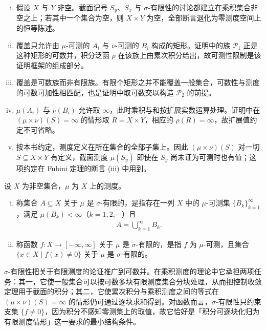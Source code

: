 \documentclass[../../main.tex]{subfiles}%
\begin{document}
\begin{remark}\label{remark:ch01-def-1-16-条件}
\begin{enumerate}[(i)]
\item 假设 $X$ 与 $Y$ 非空。截面记号 $S_y$、$S_x$ 与 $\sigma$-有限性的讨论都建立在乘积集合非空之上；若其中一个集合为空，则 $X\times Y$ 为空，全部断言退化为零测度空间上的恒等陈述。
\item 覆盖只允许由 $\mu$-可测的 $A_i$ 与 $\nu$-可测的 $B_i$ 构成的矩形。证明中的族 $\mathcal{P}_1$ 正是这种矩形的可数并，积分泛函 $\rho$ 在该族上由累次积分给出，故可测性限制是该证明框架的组成部分。
\item 覆盖是可数族而非有限族。有限个矩形之并不能覆盖一般集合，可数性与测度的可数可加性相匹配，也是证明中取可数交以构造 $\mathcal{P}_2$ 的前提。
\item $\mu(A_i)$ 与 $\nu(B_i)$ 允许取 $\infty$，此时乘积与和按扩展实数运算处理。证明中在 $(\mu\times\nu)(S)=\infty$ 的情形取 $R=X\times Y$，相应的 $\rho(R)=\infty$，故扩展值约定不可省略。
\item 按本书约定，测度定义在所在集合的全部子集上。因此 $(\mu\times\nu)(S)$ 对一切 $S\subseteq X\times Y$ 有定义，截面测度 $\mu(S_y)$ 即使在 $S_y$ 尚未证为可测时也有值；这项约定在 Fubini 定理的断言 (iii) 中用到。
\end{enumerate}
\end{remark}

\begin{definition}[$\sigma$-有限]\label{definition:ch01-1-17}
设 $X$ 为非空集合，$\mu$ 为 $X$ 上的测度。
\begin{enumerate}[(i)]
\item 称集合 $A\subseteq X$ 关于 $\mu$ 是 $\sigma$-有限的，是指存在一列 $X$ 中的 $\mu$-可测集 $\{B_k\}_{k=1}^{\infty}$，满足 $\mu(B_k)<\infty$（$k=1,2,\cdots$）且
\begin{align*}
A=\bigcup_{k=1}^{\infty}B_k.
\end{align*}
\item 称函数 $f:X\to[-\infty,\infty]$ 关于 $\mu$ 是 $\sigma$-有限的，是指 $f$ 为 $\mu$-可测，且集合 $\{x\in X\mid f(x)\neq0\}$ 关于 $\mu$ 是 $\sigma$-有限的。
\end{enumerate}
\end{definition}

\begin{remark}\label{remark:ch01-def-1-17-动机}
$\sigma$-有限性把关于有限测度的论证推广到可数并。在乘积测度的理论中它承担两项任务：其一，它使一般集合可以按可数多块有限测度集合分块处理，从而把控制收敛定理用于截面的积分；其二，它使累次积分与乘积测度之间的等式在 $(\mu\times\nu)(S)=\infty$ 的情形仍可通过逐块求和得到。对函数而言，$\sigma$-有限性只约束支集 $\{f\neq0\}$，因为积分不感知零测集上的取值，故它恰好是「积分可逐块化归为有限测度情形」这一要求的最小结构条件。
\end{remark}
\end{document}
